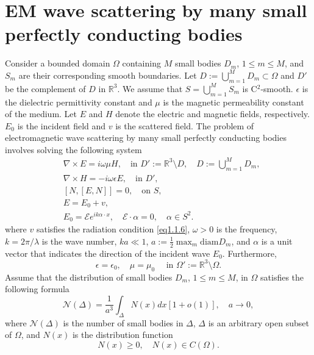 \documentclass[12pt]{article}
\numberwithin{equation}{section}
\newcommand{\be}{\begin{equation}}
\newcommand{\ee}{\end{equation}}
\newcommand{\RRR}{\mathbb{R}^3}
\begin{document}
\section{EM wave scattering by many small perfectly conducting bodies} \label{sec2}
Consider a bounded domain $\Omega$ containing $M$ small bodies $D_m$, $1\le m \le M$, and $S_m$ are their corresponding smooth boundaries. Let $D:=\bigcup_{m=1}^M D_m \subset \Omega$ and $D'$ be the complement of $D$ in $\RRR$. We assume that $S=\bigcup_{m=1}^M S_m$ is C$^2$-smooth. $\epsilon$ is  the dielectric permittivity constant and $\mu$ is the magnetic permeability constant of the medium. Let $E$ and $H$ denote the electric and magnetic fields, respectively. $E_0$ is the incident field and $v$ is the scattered field. The problem of electromagnetic wave scattering by many small perfectly conducting bodies  involves solving the following system
\begin{align}
            &\nabla \times E=i \omega \mu H, \quad \text{in }D':=\RRR \setminus D, \quad D:=\bigcup_{m=1}^M D_m, \label{eq2.1.1} \\
            &\nabla \times H=-i \omega \epsilon E, \quad \text{in }D', \label{eq2.1.2} \\
            &[N,[E, N]]=0, \quad \text{on } S,  \label{eq2.1.3} \\
            &E=E_0+v,  \label{eq2.1.4} \\
            &E_0=\mathcal{E} e^{ik\alpha\cdot x}, \quad \mathcal{E} \cdot \alpha=0,
            \quad \alpha \in S^2. \label{eq2.1.5}
\end{align}
where $v$ satisfies the radiation condition \eqref{eq1.1.6}, $\omega>0$ is the frequency, $k=2\pi/\lambda$ is the wave number, $ka \ll 1$, $a:=\frac{1}{2}\max_m \text{diam}D_m$, and $\alpha$ is a unit vector that indicates the direction of the incident wave $E_0$. Furthermore,
\be \label{eq2.1.7}
    \epsilon=\epsilon_0, \quad \mu=\mu_0 \quad \text{ in } \Omega':=\RRR \setminus \Omega.
\ee
Assume that the distribution of small bodies $D_m$, $1 \le m \le M$, in $\Omega$ satisfies the following formula
\be \label{eq2.1.8}
    \mathcal{N}(\Delta)=\frac{1}{a^3} \int_\Delta N(x)dx[1+o(1)], \quad a\to 0,
\ee
where $\mathcal{N}(\Delta)$ is the number of small bodies in $\Delta$, $\Delta$ is an arbitrary open subset of $\Omega$, and $N(x)$ is the distribution function
\be \label{eq2.1.9}
    N(x)\ge 0, \quad N(x) \in C(\Omega).
\ee
\end{document}
